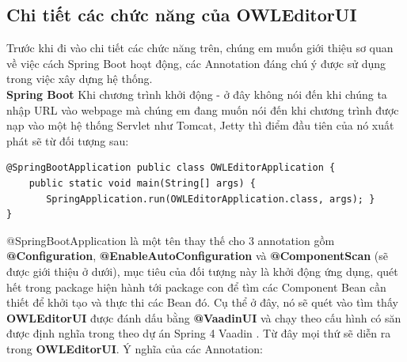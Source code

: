 \subsection{Chi tiết các chức năng của OWLEditorUI}
Trước khi đi vào chi tiết các chức năng trên, chúng em muốn giới thiệu sơ quan về việc cách Spring Boot \cite{springboot} hoạt động, các Annotation đáng chú ý được sử dụng trong việc xây dựng hệ thống.
\\
\textbf{Spring Boot} Khi chương trình khởi động - ở đây không nói đến khi chúng ta nhập URL vào webpage mà chúng em đang muốn nói đến khi chương trình được nạp vào một hệ thống Servlet như Tomcat, Jetty thì điểm đầu tiên của nó xuất phát sẽ từ đối tượng sau:
\begin{verbatim}
@SpringBootApplication public class OWLEditorApplication {
    public static void main(String[] args) {
       SpringApplication.run(OWLEditorApplication.class, args); }
}
\end{verbatim} 
@SpringBootApplication là một tên thay thế cho 3 annotation gồm \textbf{@Configuration}, \textbf{@EnableAutoConfiguration} và \textbf{@ComponentScan} (sẽ được giới thiệu ở dưới), mục tiêu của đối tượng này là khởi động ứng dụng, quét hết trong package hiện hành tới package con để tìm các Component Bean cần thiết để khởi tạo và thực thi các Bean đó. Cụ thể ở đây, nó sẽ quét vào tìm thấy \textbf{OWLEditorUI} được đánh dấu bằng \textbf{@VaadinUI} và chạy theo cấu hình có săn được định nghĩa trong theo dự án Spring 4 Vaadin \cite{spring4vaadin}. Từ đây mọi thứ sẽ diễn ra trong \textbf{OWLEditorUI}. Ý nghĩa của các Annotation:
